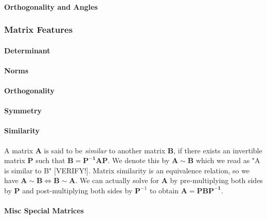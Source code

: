\paragraph{Orthogonality and Angles}
% 

\subsubsection{Matrix Features}

\paragraph{Determinant}

\paragraph{Norms}

\paragraph{Orthogonality}

\paragraph{Symmetry}

\paragraph{Similarity}
A matrix $\mathbf{A}$ is said to be \emph{similar} to another matrix $\mathbf{B}$, if there exists an invertible matrix $\mathbf{P}$ such that $\mathbf{B} = \mathbf{P^{-1} A P}$. We denote this by $\mathbf{A} \sim \mathbf{B}$ which we read as "A is similar to B" [VERIFY!]. Matrix similarity is an equivalence relation, so we have $\mathbf{A} \sim \mathbf{B} \Leftrightarrow \mathbf{B} \sim \mathbf{A}$. We can actually solve for $\mathbf{A}$ by pre-multiplying both sides by $\mathbf{P}$ and post-multiplying both sides by $\mathbf{P}^{-1}$ to obtain $\mathbf{A} = \mathbf{P B P^{-1}}$. 


\paragraph{Misc Special Matrices}










